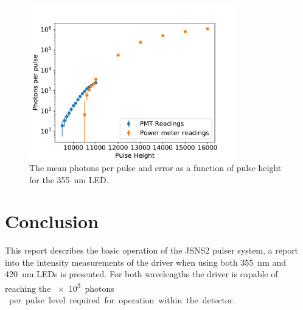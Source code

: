 \documentclass[11pt, a4paper, oneside ]{article}
\begin{document}
\begin{figure}[H]
    \centering
    \includegraphics[width=0.8\textwidth]{figures/PhotonCounts355nm.pdf}
    \caption{The mean photons per pulse and error as a function of pulse height for the \SI{355}{nm} LED.}
    \label{fig:measurements355nm}
\end{figure}

\section{Conclusion}
This report describes the basic operation of the JSNS2 pulser system, a report into the intensity measurements of the driver when using both \SI{355}{nm} and \SI{420}{nm} LEDs is presented. For both wavelengths the driver is capable of reaching the \SI{e3}{photons } per pulse level required for operation within the detector.


\end{document}
